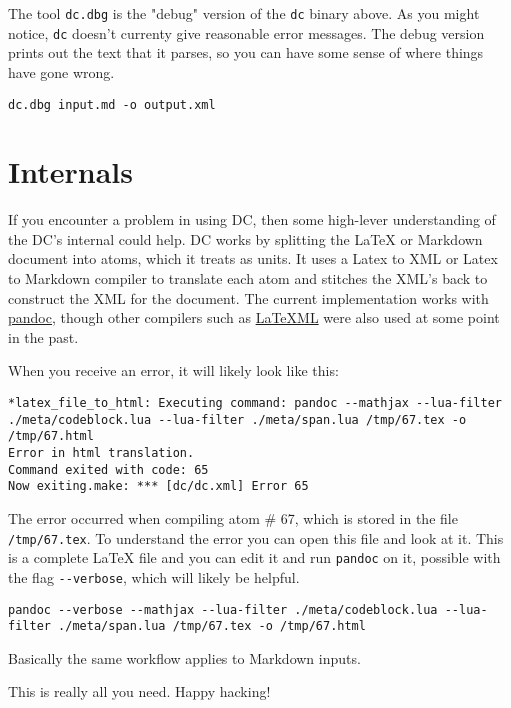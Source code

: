 \begin{gram} 
The tool \lstinline`dc.dbg` is the "debug" version of the \lstinline`dc` binary above. As you might notice, \lstinline`dc` doesn't currenty give reasonable error messages.  The debug version prints out the text that it parses, so you can have some sense of where things have gone wrong. 

\begin{lstlisting}
dc.dbg input.md -o output.xml
\end{lstlisting}
\end{gram}

\section{Internals}

If you encounter a problem in using DC, then some high-lever understanding of the DC's internal could help.
%
DC works by splitting the LaTeX or Markdown document into atoms, which it treats as units.
%
It uses a Latex to XML or Latex to Markdown compiler to translate each atom and stitches the XML's back to construct the XML for the document.
%
The current implementation works with \href{www.pandoc.org}{pandoc}, though other compilers such as \href{https://dlmf.nist.gov/LaTeXML/}{LaTeXML} were also used at some point in the past.  

When you receive an error, it will likely look like this:
\begin{lstlisting}
*latex_file_to_html: Executing command: pandoc --mathjax --lua-filter ./meta/codeblock.lua --lua-filter ./meta/span.lua /tmp/67.tex -o /tmp/67.html
Error in html translation.
Command exited with code: 65
Now exiting.make: *** [dc/dc.xml] Error 65
\end{lstlisting} 
% 
The error occurred when compiling atom \# 67, which is stored in the file \lstinline`/tmp/67.tex`.
%
To understand the error you can open this file and look at it.  This is a complete LaTeX file and you can edit it and run \lstinline`pandoc` on it, possible with the flag \lstinline`--verbose`, which will likely be helpful.
\begin{lstlisting}
pandoc --verbose --mathjax --lua-filter ./meta/codeblock.lua --lua-filter ./meta/span.lua /tmp/67.tex -o /tmp/67.html
\end{lstlisting}
%
Basically the same workflow applies to Markdown inputs.

This is really all you need. Happy hacking!
